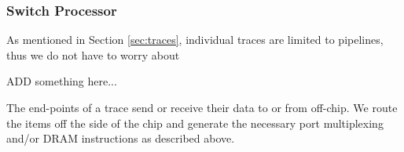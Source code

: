\subsubsection{Switch Processor}
As mentioned in Section \ref{sec:traces}, individual traces are
limited to pipelines, thus we do not have to worry about

ADD something here...

The end-points of a trace send or receive their data to or
from off-chip.  We route the items off the side of the chip and
generate the necessary port multiplexing and/or DRAM instructions as
described above.

